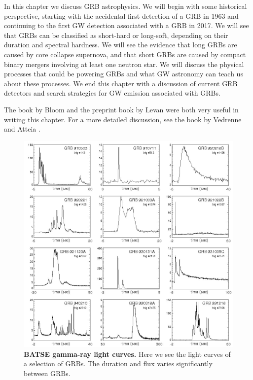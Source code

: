 \documentclass[11pt]{cuthesis}
\begin{document}
In this chapter we discuss GRB astrophysics. We will begin with some historical perspective, starting with the accidental first detection of a GRB in 1963 and continuing to the first GW detection associated with a GRB in 2017. We will see that GRBs can be classified as short-hard or long-soft, depending on their duration and spectral hardness. We will see the evidence that long GRBs are caused by core collapse supernova, and that short GRBs are caused by compact binary mergers involving at least one neutron star. We will discuss the physical processes that could be powering GRBs and what GW astronomy can teach us about these processes. We end this chapter with a discussion of current GRB detectors and search strategies for GW emission associated with GRBs.

The book by Bloom \cite{bloom_grbs} and the preprint book by Levan \cite{levan_grbs} were both very useful in writing this chapter. For a more detailed discussion, see the book by Vedrenne and Atteia \cite{vedrenne_gamma-ray}.

\begin{figure} %
\begin{center}
\includegraphics[width=1.0\linewidth]{grb_lightcurves.png}
\end{center}
\caption{\textbf{BATSE gamma-ray light curves.} Here we see the light curves of a selection of GRBs. The duration and flux varies significantly between GRBs. \cite{GRBprompt} } 
\label{fig:grb lightcurves}
\end{figure}
\end{document}
